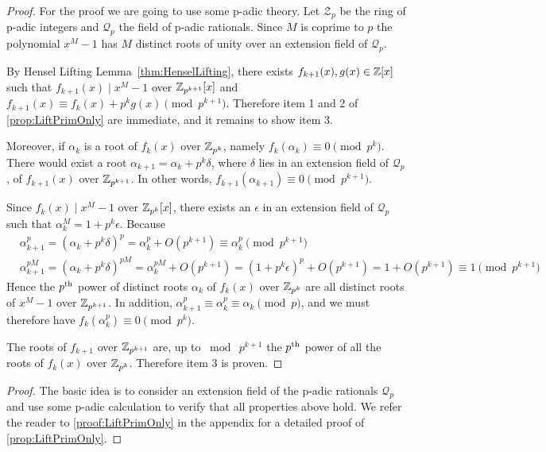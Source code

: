 \ifFullVersion
\begin{proof}
    For the proof we are going to use some p-adic theory. Let \(\mathcal{Z}_p\) be the ring of p-adic integers and \(\mathcal{Q}_p\) the field of p-adic rationals. Since \(M\) is coprime to \(p\) the polynomial \(x^M - 1\) has \(M\) distinct roots of unity over an extension field of \(\mathcal{Q}_p\).

    By Hensel Lifting Lemma~\cref{thm:HenselLifting}, there exists \(f_{k+1}(x), g(x) \in \mathbb{Z}[x]\) such that \(f_{k+1}(x) \mid x^M - 1\) over \(\mathbb{Z}_{p^{k+1}}[x]\) and \(f_{k+1}(x) \equiv f_k(x) + p^k g(x) \pmod{p^{k+1}}\). Therefore item 1 and 2 of \cref{prop:LiftPrimOnly} are immediate, and it remains to show item 3.

    Moreover, if \(\alpha_k\) is a root of \(f_k(x)\) over \(\mathbb{Z}_{p^k}\), namely \(f_k(\alpha_k) \equiv 0 \pmod{p^k}\). There would exist a root \(\alpha_{k+1} = \alpha_k + p^k \delta\), where \(\delta\) lies in an extension field of \(\mathcal{Q}_p\), of \(f_{k+1}(x)\) over \(\mathbb{Z}_{p^{k+1}}\). In other words, \(f_{k+1}(\alpha_{k+1}) \equiv 0 \pmod{p^{k+1}}\).

    Since \(f_k(x) \mid x^M - 1\) over \(\mathbb{Z}_{p^k}[x]\), there exists an \(\epsilon\) in an extension field of \(\mathcal{Q}_p\) such that \(\alpha_k^M = 1 + p^k \epsilon\). Because
    \begin{align*}
        &\alpha_{k+1}^p = (\alpha_k + p^k \delta)^p = \alpha_k^p + O(p^{k+1}) \equiv \alpha_k^p \pmod{p^{k+1}} \\
        &\alpha_{k+1}^{pM} = (\alpha_k + p^k \delta)^{pM} = \alpha_k^{pM} + O(p^{k+1}) = (1 + p^k \epsilon)^p + O(p^{k+1}) = 1 + O(p^{k+1}) \equiv 1 \pmod{p^{k+1}}
    \end{align*}
    Hence the \(p\textsuperscript{th}\) power of distinct roots \(\alpha_k\) of \(f_k(x)\) over \(\mathbb{Z}_{p^k}\) are all distinct roots of \(x^M - 1\) over \(\mathbb{Z}_{p^{k+1}}\). In addition, \(\alpha_{k+1}^p \equiv \alpha_k^p \equiv \alpha_k \pmod{p}\), and we must therefore have \(f_k(\alpha_k^p) \equiv 0 \pmod{p^k}\).

    The roots of \(f_{k+1}\) over \(\mathbb{Z}_{p^{k+1}}\) are, up to \(\bmod \  p^{k+1}\) the \(p\textsuperscript{th}\) power of all the roots of \(f_k(x)\) over \(\mathbb{Z}_{p^k}\). Therefore item 3 is proven.
\end{proof}
\else
\begin{proof}
    The basic idea is to consider an extension field of the p-adic rationals \(\mathcal{Q}_p\) and use some p-adic calculation to verify that all properties above hold. We refer the reader to \cref{proof:LiftPrimOnly} in the appendix for a detailed proof of \cref{prop:LiftPrimOnly}.
\end{proof}
\fi

